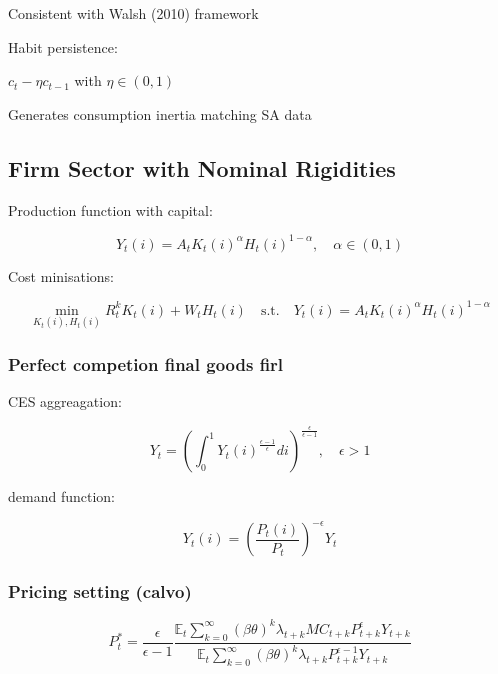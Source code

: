 \documentclass[11pt,preprint]{elsarticle}
\numberwithin{equation}{section}
\numberwithin{figure}{section}
\numberwithin{table}{section}
\begin{document}
Consistent with Walsh (2010) framework

Habit persistence:

\(c_t - \eta c_{t-1}\) with \(\eta \in (0,1)\)

Generates consumption inertia matching SA data

\subsection{Firm Sector with Nominal
Rigidities}\label{firm-sector-with-nominal-rigidities}

Production function with capital:

\begin{equation}
Y_t(i) = A_t K_t(i)^{\alpha} H_t(i)^{1-\alpha}, \quad \alpha \in (0,1)
\label{production}
\end{equation}

Cost minisations:

\begin{equation}
\min_{K_t(i), H_t(i)} R_t^k K_t(i) + W_t H_t(i) \quad \text{s.t.} \quad Y_t(i) = A_t K_t(i)^{\alpha} H_t(i)^{1-\alpha}
\end{equation}

\subsubsection{Perfect competion final goods
firl}\label{perfect-competion-final-goods-firl}

CES aggreagation:

\begin{equation}
Y_t = \left( \int_0^1 Y_t(i)^{\frac{\epsilon-1}{\epsilon}} di \right)^{\frac{\epsilon}{\epsilon-1}}, \quad \epsilon > 1
\label{ces_aggregator}
\end{equation}

demand function:

\begin{equation}
Y_t(i) = \left( \frac{P_t(i)}{P_t} \right)^{-\epsilon} Y_t
\label{demand_curve}
\end{equation}

\subsubsection{Pricing setting (calvo)}\label{pricing-setting-calvo}

\begin{equation}
P_t^* = \frac{\epsilon}{\epsilon-1} \frac{
\mathbb{E}_t \sum_{k=0}^{\infty} (\beta\theta)^k \lambda_{t+k} MC_{t+k} P_{t+k}^{\epsilon} Y_{t+k}
}{
\mathbb{E}_t \sum_{k=0}^{\infty} (\beta\theta)^k \lambda_{t+k} P_{t+k}^{\epsilon-1} Y_{t+k}
}
\label{optimal_price}
\end{equation}
\end{document}
